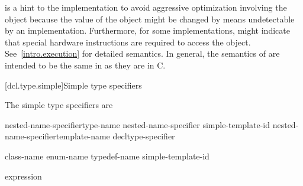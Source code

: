 \pnum
{}%
%
\begin{note}
 is a hint to the implementation to avoid aggressive
optimization involving the object because the value of the object might
be changed by means undetectable by an implementation.
Furthermore, for some implementations,  might indicate that
special hardware instructions are required to access the object.
See~\ref{intro.execution} for detailed semantics. In general, the
semantics of  are intended to be the same in \Cpp as
they are in C.
\end{note}

[dcl.type.simple]{Simple type specifiers}%

\pnum
The simple type specifiers are

\begin{bnf}
\br
    nested-name-specifier\opt type-name\br
    nested-name-specifier  simple-template-id\br
    nested-name-specifier\opt template-name\br
    \br
    \br
    \br
    \br
    \br
    \br
    \br
    \br
    \br
    \br
    \br
    \br
    \br
    \br
    decltype-specifier
\end{bnf}

\begin{bnf}
\br
    class-name\br
    enum-name\br
    typedef-name\br
    simple-template-id
\end{bnf}

\begin{bnf}
\br
   \terminal{(} expression \terminal{)}\br
   \terminal{(}  \terminal{)}
\end{bnf}

